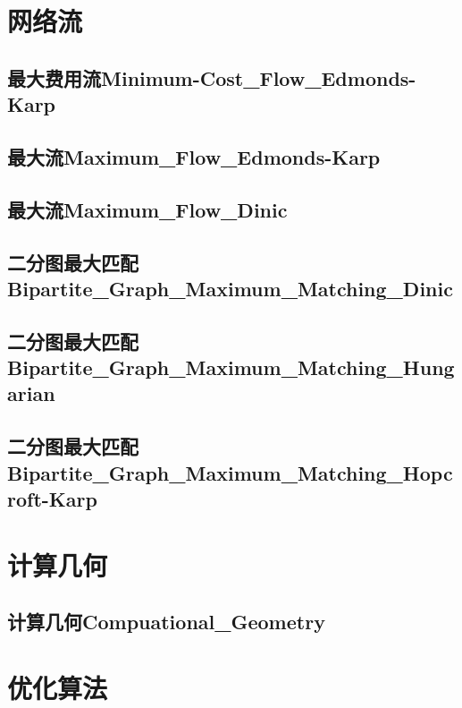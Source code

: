 \documentclass[10pt,a4paper]{article}
\begin{document}
\newpage
\section{网络流}
\subsection{最大费用流Minimum-Cost\_Flow\_Edmonds-Karp}

\subsection{最大流Maximum\_Flow\_Edmonds-Karp}

\subsection{最大流Maximum\_Flow\_Dinic}

\subsection{二分图最大匹配Bipartite\_Graph\_Maximum\_Matching\_Dinic}

\subsection{二分图最大匹配Bipartite\_Graph\_Maximum\_Matching\_Hungarian}

\subsection{二分图最大匹配Bipartite\_Graph\_Maximum\_Matching\_Hopcroft-Karp}


\newpage
\section{计算几何}
\subsection{计算几何Compuational\_Geometry}


\newpage
\section{优化算法}
\end{document}
